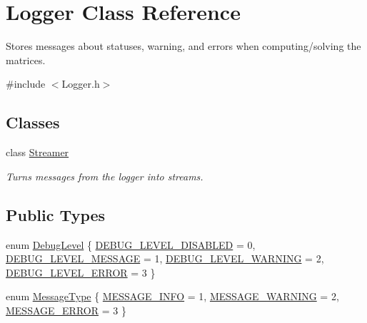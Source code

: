 \hypertarget{class_logger}{}\section{Logger Class Reference}
\label{class_logger}


Stores messages about statuses, warning, and errors when computing/solving the matrices.  




{\ttfamily \#include $<$Logger.\+h$>$}

\subsection*{Classes}
\begin{DoxyCompactItemize}
\item 
class \hyperlink{class_logger_1_1_streamer}{Streamer}
\begin{DoxyCompactList}\small\item\em Turns messages from the logger into streams. \end{DoxyCompactList}\end{DoxyCompactItemize}
\subsection*{Public Types}
\begin{DoxyCompactItemize}
\item 
enum \hyperlink{class_logger_a96ecc57d01700c7b14d101f0f65a9932}{Debug\+Level} \{ \hyperlink{class_logger_a96ecc57d01700c7b14d101f0f65a9932a7b8ac14048332d269a8906cf35a8f973}{D\+E\+B\+U\+G\+\_\+\+L\+E\+V\+E\+L\+\_\+\+D\+I\+S\+A\+B\+L\+E\+D} = 0, 
\hyperlink{class_logger_a96ecc57d01700c7b14d101f0f65a9932ad735b06bac4fffca2f9bf16208eac87f}{D\+E\+B\+U\+G\+\_\+\+L\+E\+V\+E\+L\+\_\+\+M\+E\+S\+S\+A\+G\+E} = 1, 
\hyperlink{class_logger_a96ecc57d01700c7b14d101f0f65a9932a46a078625711e9468bf4e826ad4080cb}{D\+E\+B\+U\+G\+\_\+\+L\+E\+V\+E\+L\+\_\+\+W\+A\+R\+N\+I\+N\+G} = 2, 
\hyperlink{class_logger_a96ecc57d01700c7b14d101f0f65a9932ab04462d3e3fd0239206907fbb50aa888}{D\+E\+B\+U\+G\+\_\+\+L\+E\+V\+E\+L\+\_\+\+E\+R\+R\+O\+R} = 3
 \}
\item 
enum \hyperlink{class_logger_ad09ea848c6228767e3ad1085da600cd8}{Message\+Type} \{ \hyperlink{class_logger_ad09ea848c6228767e3ad1085da600cd8a1cc5c7b6ed879245311642dd5828eb8a}{M\+E\+S\+S\+A\+G\+E\+\_\+\+I\+N\+F\+O} = 1, 
\hyperlink{class_logger_ad09ea848c6228767e3ad1085da600cd8af1f08341e9afea32da2fd05dced650e0}{M\+E\+S\+S\+A\+G\+E\+\_\+\+W\+A\+R\+N\+I\+N\+G} = 2, 
\hyperlink{class_logger_ad09ea848c6228767e3ad1085da600cd8ab028f87d2c08b1f813a7e3eecc418ae0}{M\+E\+S\+S\+A\+G\+E\+\_\+\+E\+R\+R\+O\+R} = 3
 \}
\end{DoxyCompactItemize}
